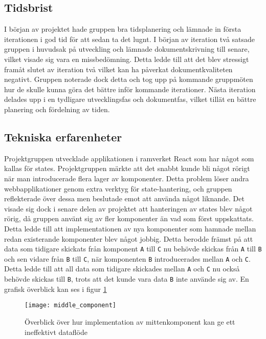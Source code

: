 \subsection{Tidsbrist}
I början av projektet hade gruppen bra tidsplanering och lämnade in första iterationen i god tid för att sedan ta det lugnt. I början av iteration två satsade gruppen i huvudsak på utveckling och lämnade dokumentskrivning till senare, vilket visade sig vara en missbedömning. Detta ledde till att det blev stressigt framåt slutet av iteration två vilket kan ha påverkat dokumentkvaliteten negativt. Gruppen noterade dock detta och tog upp på kommande gruppmöten hur de skulle kunna göra det bättre inför kommande iterationer. Nästa iteration delades upp i en tydligare utvecklingsfas och dokumentfas, vilket tillät en bättre planering och fördelning av tiden.

\subsection{Tekniska erfarenheter}
Projektgruppen utvecklade applikationen i ramverket React som har något som kallas för states. Projektgruppen märkte att det snabbt kunde bli något rörigt när man introducerade flera lager av komponenter. Detta problem löser andra webbapplikationer genom extra verktyg för state-hantering, och gruppen reflekterade över dessa men beslutade emot att använda något liknande. Det visade sig dock i senare delen av projektet att hanteringen av states blev något rörig, då gruppen använt sig av fler komponenter än vad som först uppskattats. Detta ledde till att implementationen av nya komponenter som hamnade mellan redan existerande komponenter blev något jobbig. Detta berodde främst på att data som tidigare skickats från komponent \texttt{A} till \texttt{C} nu behövde skickas från \texttt{A} till \texttt{B} och sen vidare från \texttt{B} till \texttt{C}, när komponenten \texttt{B} introducerades mellan \texttt{A} och \texttt{C}. Detta ledde till att all data som tidigare skickades mellan \texttt{A} och \texttt{C} nu också behövde skickas till \texttt{B}, trots att det kunde vara data \texttt{B} inte använde sig av. En grafisk överblick kan ses i figur \ref{fig:middle_component}

\begin{figure}[H]
    \centering
    \texttt{[image: middle\_component]}
    \caption{Överblick över hur implementation av mittenkomponent kan ge ett ineffektivt dataflöde}
    \label{fig:middle_component}
\end{figure}

